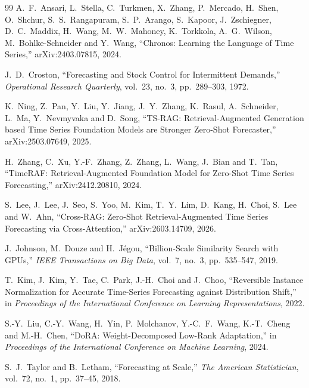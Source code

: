 \documentclass[twocolumn, lastpage]{jarticle}
\begin{document}
\begin{thebibliography}{99}
A.~F.~Ansari, L.~Stella, C.~Turkmen, X.~Zhang, P.~Mercado, H.~Shen, O.~Shchur,
S.~S.~Rangapuram, S.~P.~Arango, S.~Kapoor, J.~Zschiegner, D.~C.~Maddix,
H.~Wang, M.~W.~Mahoney, K.~Torkkola, A.~G.~Wilson, M.~Bohlke-Schneider and Y.~Wang,
``Chronos: Learning the Language of Time Series,''
arXiv:2403.07815, 2024.


J.~D.~Croston,
``Forecasting and Stock Control for Intermittent Demands,''
\textit{Operational Research Quarterly}, vol.~23, no.~3, pp.~289--303, 1972.

K.~Ning, Z.~Pan, Y.~Liu, Y.~Jiang, J.~Y.~Zhang, K.~Rasul, A.~Schneider, L.~Ma, Y.~Nevmyvaka and D.~Song,
``TS-RAG: Retrieval-Augmented Generation based Time Series Foundation Models are Stronger Zero-Shot Forecaster,''
arXiv:2503.07649, 2025.

H.~Zhang, C.~Xu, Y.-F.~Zhang, Z.~Zhang, L.~Wang, J.~Bian and T.~Tan,
``{TimeRAF}: Retrieval-Augmented Foundation Model for Zero-Shot Time Series Forecasting,''
arXiv:2412.20810, 2024.

S.~Lee, J.~Lee, J.~Seo, S.~Yoo, M.~Kim, T.~Y.~Lim, D.~Kang, H.~Choi, S.~Lee and W.~Ahn,
``Cross-RAG: Zero-Shot Retrieval-Augmented Time Series Forecasting via Cross-Attention,''
arXiv:2603.14709, 2026.

J.~Johnson, M.~Douze and H.~J\'{e}gou,
``Billion-Scale Similarity Search with {GPU}s,''
\textit{IEEE Transactions on Big Data}, vol.~7, no.~3, pp.~535--547, 2019.

T.~Kim, J.~Kim, Y.~Tae, C.~Park, J.-H.~Choi and J.~Choo,
``Reversible Instance Normalization for Accurate Time-Series Forecasting against Distribution Shift,''
in \textit{Proceedings of the International Conference on Learning Representations}, 2022.

S.-Y.~Liu, C.-Y.~Wang, H.~Yin, P.~Molchanov, Y.-C.~F.~Wang, K.-T.~Cheng and M.-H.~Chen,
``{DoRA}: Weight-Decomposed Low-Rank Adaptation,''
in \textit{Proceedings of the International Conference on Machine Learning}, 2024.

S.~J.~Taylor and B.~Letham,
``Forecasting at Scale,''
\textit{The American Statistician}, vol.~72, no.~1, pp.~37--45, 2018.


\end{thebibliography}
\end{document}
